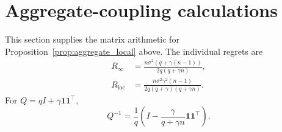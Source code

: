 \section{Aggregate-coupling calculations}
\label{app:technical-aggregate}
This section supplies the matrix arithmetic for Proposition~\ref{prop:aggregate_local}
above. The individual regrets are
\begin{align}
    R_\infty
    &=
    \frac{
        n\sigma^2
        \left(
            q+\gamma(n-1)
        \right)
    }{
        2q(q+\gamma n)
    },
    \label{eq:aggregate_Rinf}
    \\
    R_{\mathrm{loc}}
    &=
    \frac{
        n\sigma^2\gamma^2(n-1)
    }{
        2q(q+\gamma)(q+\gamma n)
    }.
    \label{eq:aggregate_Rloc}
\end{align}
For $Q=qI+\gamma\mathbf1\mathbf1^\top$,
\[
Q^{-1}=\frac1q\left(I-\frac{\gamma}{q+\gamma n}\mathbf1\mathbf1^\top\right).
\]
